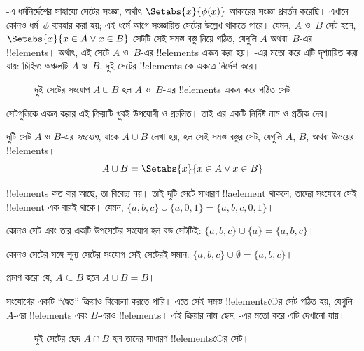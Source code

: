 \documentclass[../../../include/open-logic-section]{subfiles}
\begin{document}

\begin{explain}
-এ ধর্মনির্দেশের সাহায্যে সেটের সংজ্ঞা,
অর্থাৎ $\Setabs{x}{\phi(x)}$ আকারের সংজ্ঞা প্রবর্তন করেছি। এখানে
কোনও ধর্ম~$\phi$ ব্যবহার করা হয়; এই ধর্মে আগে সংজ্ঞায়িত সেটের উল্লেখ
থাকতে পারে। যেমন, $A$ ও~$B$ সেট হলে,
$\Setabs{x}{x \in A \lor x \in B}$ সেটটি সেই সমস্ত বস্তু নিয়ে গঠিত,
যেগুলি $A$ অথবা~$B$-এর !!{element}s। অর্থাৎ, এই সেটে $A$ ও~$B$-এর
!!{element}s একত্র করা হয়। -এর মতো করে এটি
দৃশ্যায়িত করা যায়: চিহ্নিত অঞ্চলটি $A$ ও~$B$, দুই সেটের
!!{element}s-কে একত্রে নির্দেশ করে।

\begin{figure}
  \caption{দুই সেটের সংযোগ $A \cup B$ হল $A$ ও~$B$-এর
    !!{element}s একত্র করে গঠিত সেট।}
\end{figure}

সেটগুলিকে একত্র করার এই ক্রিয়াটি খুবই উপযোগী ও প্রচলিত।
তাই এর একটি নির্দিষ্ট নাম ও প্রতীক দেব।
\end{explain}

\begin{defn}[সংযোগ]
দুটি সেট $A$ ও $B$-এর \emph{সংযোগ}, যাকে $A \cup B$ লেখা হয়,
হল সেই সমস্ত বস্তুর সেট, যেগুলি $A$, $B$, অথবা উভয়ের !!{element}s।
\[
A \cup B = \Setabs{x}{x \in A \lor x \in B}
\]
\end{defn}

\begin{ex}
!!{element}s কত বার আছে, তা বিবেচ্য নয়। তাই দুটি সেটে সাধারণ
!!a{element} থাকলে, তাদের সংযোগে সেই !!{element} এক বারই থাকে।
যেমন, $\{ a, b, c\} \cup \{ a, 0, 1\} = \{a, b, c, 0, 1\}$।

কোনও সেট এবং তার একটি উপসেটের সংযোগ হল বড় সেটটিই:
$\{a, b, c \} \cup \{a \} = \{a, b, c\}$।

কোনও সেটের সঙ্গে শূন্য সেটের সংযোগ সেই সেটেরই সমান:
$\{a, b, c \} \cup \emptyset = \{a, b, c \}$।
\end{ex}

\begin{prob}
প্রমাণ করো যে, $A \subseteq B$ হলে $A \cup B = B$।
\end{prob}

\begin{explain}
সংযোগের একটি ``দ্বৈত'' ক্রিয়াও বিবেচনা করতে পারি। এতে সেই সমস্ত
!!{element}sের সেট গঠিত হয়, যেগুলি $A$-এর !!{element}s এবং
$B$-এরও !!{element}s। এই ক্রিয়ার নাম \emph{ছেদ};
-এর মতো করে এটি দেখানো যায়।
\begin{figure}
  \caption{দুই সেটের ছেদ $A \cap B$ হল তাদের সাধারণ
    !!{element}sের সেট।}
\end{figure}
\end{explain}
\end{document}
